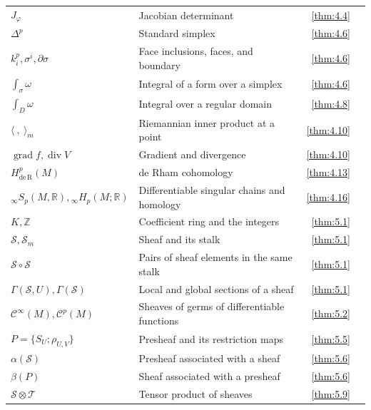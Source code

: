 {\begin{longtable}{@{}>{\raggedright\arraybackslash}p{.39\linewidth}>{\raggedright\arraybackslash}p{.39\linewidth}r r@{}}
$J_\varphi$ & Jacobian determinant & \ref{thm:4.4} & \pageref{thm:4.4} \\
$\Delta^{p}$ & Standard simplex & \ref{thm:4.6} & \pageref{thm:4.6} \\
$k_{i}^{p},\allowbreak \sigma^{i},\allowbreak \partial\sigma$ & Face inclusions, faces, and boundary & \ref{thm:4.6} & \pageref{thm:4.6} \\
$\int_\sigma\omega$ & Integral of a form over a simplex & \ref{thm:4.6} & \pageref{thm:4.6} \\
$\int_{D}\omega$ & Integral over a regular domain & \ref{thm:4.8} & \pageref{thm:4.8} \\
$\langle\ ,\allowbreak \ \rangle_{m}$ & Riemannian inner product at a point & \ref{thm:4.10} & \pageref{thm:4.10} \\
$\operatorname{grad}f,\allowbreak \operatorname{div}V$ & Gradient and divergence & \ref{thm:4.10} & \pageref{thm:4.10} \\
$H_{\mathrm{de\,\allowbreak R}}^p(M)$ & de Rham cohomology & \ref{thm:4.13} & \pageref{thm:4.13} \\
${}_\infty S_p(M,\allowbreak \mathbb R),\allowbreak {}_\infty H_p(M;\mathbb R)$ & Differentiable singular chains and homology & \ref{thm:4.16} & \pageref{thm:4.16} \\
$K,\allowbreak \mathbb Z$ & Coefficient ring and the integers & \ref{thm:5.1} & \pageref{thm:5.1} \\
$\mathcal S,\allowbreak \mathcal S_m$ & Sheaf and its stalk & \ref{thm:5.1} & \pageref{thm:5.1} \\
$\mathcal S\circ\mathcal S$ & Pairs of sheaf elements in the same stalk & \ref{thm:5.1} & \pageref{thm:5.1} \\
$\Gamma(\mathcal S,\allowbreak U),\allowbreak \Gamma(\mathcal S)$ & Local and global sections of a sheaf & \ref{thm:5.1} & \pageref{thm:5.1} \\
$\mathcal C^\infty(M),\allowbreak \mathcal C^p(M)$ & Sheaves of germs of differentiable functions & \ref{thm:5.2} & \pageref{thm:5.2} \\
$P=\{S_{U};\rho_{U,\allowbreak V}\}$ & Presheaf and its restriction maps & \ref{thm:5.5} & \pageref{thm:5.5} \\
$\alpha(\mathcal S)$ & Presheaf associated with a sheaf & \ref{thm:5.6} & \pageref{thm:5.6} \\
$\beta(P)$ & Sheaf associated with a presheaf & \ref{thm:5.6} & \pageref{thm:5.6} \\
$\mathcal S\otimes\mathcal T$ & Tensor product of sheaves & \ref{thm:5.9} & \pageref{thm:5.9} \\

\end{longtable}}
